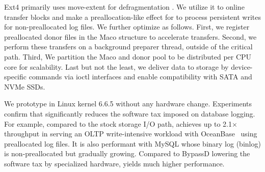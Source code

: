 Ext4 primarily uses move-extent   for  defragmentation \cite{ext4moveextent}.
We    utilize it to online transfer  blocks and 
make a preallocation-like effect for \odes to process persistent writes for non-preallocated log files.
We further optimize \odes as follows.
First, we register preallocated donor files in the Maco  structure
to accelerate  transfers.
Second, we
perform these transfers on a background preparer thread, outside of the critical path.
Third,
We partition the Maco and donor pool  to be  distributed per CPU core for scalability. 
Last but not the least, we deliver data to storage   by device-specific commands via   ioctl interfaces and enable
compatibility
with  SATA and NVMe SSDs.

We  prototype \odes in Linux kernel 6.6.5 without any hardware change. 
Experiments confirm  that 
\odes significantly reduces the   software tax imposed on database logging.
For example,
compared to the stock storage I/O path, \odes achieves 
up to 2.1$\times$ throughput in serving an OLTP write-intensive workload
with  OceanBase~\cite{DB:OceanBase:VLDB-2022} using preallocated log files. 
It is also performant with MySQL whose binary log (binlog) is non-preallocated but gradually growing.
Compared to BypassD lowering the software tax by  
 specialized hardware,
\odes yields much higher performance.

